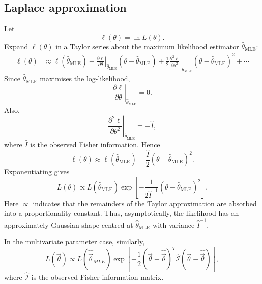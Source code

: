 \documentclass[11pt, titlepage]{article} %
\numberwithin{equation}{section}
\theoremstyle{definition}
\numberwithin{assumption}{section}
\begin{document}
\subsection{Laplace approximation}

Let
\begin{equation*}
    \ell(\theta)=\ln L(\theta).
\end{equation*}
Expand $\ell(\theta)$ in a Taylor series about the maximum likelihood estimator $\hat{\theta}_{\mathrm{MLE}}$:
\begin{align*}
    \ell(\theta)
    &\approx
    \ell(\hat{\theta}_{\mathrm{MLE}})
    +
    \left.\frac{\partial \ell}{\partial \theta}\right|_{\hat{\theta}_{\mathrm{MLE}}}
    (\theta-\hat{\theta}_{\mathrm{MLE}})
    +
    \frac12
    \left.\frac{\partial^2 \ell}{\partial \theta^2}\right|_{\hat{\theta}_{\mathrm{MLE}}}
    (\theta-\hat{\theta}_{\mathrm{MLE}})^2
    +\cdots
\end{align*}
Since $\hat{\theta}_{\mathrm{MLE}}$ maximises the log-likelihood,
\begin{equation*}
    \left.\frac{\partial \ell}{\partial \theta}\right|_{\hat{\theta}_{\mathrm{MLE}}}=0.
\end{equation*}
Also, 
\begin{equation*}
    \left.\frac{\partial^2 \ell}{\partial \theta^2}\right|_{\hat{\theta}_{\mathrm{MLE}}}
    =-\hat I,
\end{equation*}
where $\hat I$ is the observed Fisher information. Hence
\begin{equation*}
    \ell(\theta)
    \approx
    \ell(\hat{\theta}_{\mathrm{MLE}})
    -\frac{\hat I}{2}(\theta-\hat{\theta}_{\mathrm{MLE}})^2.
\end{equation*}
Exponentiating gives
\begin{equation*}
    L(\theta)
    \propto
    L(\hat{\theta}_{\mathrm{MLE}})
    \exp\!\left[
    -\frac{1}{2\hat I^{-1}}(\theta-\hat{\theta}_{\mathrm{MLE}})^2
    \right].
\end{equation*}
Here $\propto$ indicates that the remainders of the Taylor approximation are absorbed into a proportionality constant. Thus, asymptotically, the likelihood has an approximately Gaussian shape centred at $\hat{\theta}_{\mathrm{MLE}}$ with variance $\hat I^{-1}$.

In the multivariate parameter case, similarly,
\begin{equation*}
    L(\vec \theta)
    \propto
    L(\hat{\vec \theta}_{MLE})
    \exp\!\left[
    -\frac12
    (\vec \theta-\hat{\vec \theta})^T
    \hat{\mathcal I}
    (\vec \theta-\hat{\vec \theta})
    \right],
\end{equation*}
where $\hat{\mathcal I}$ is the observed Fisher information matrix.
\end{document}
